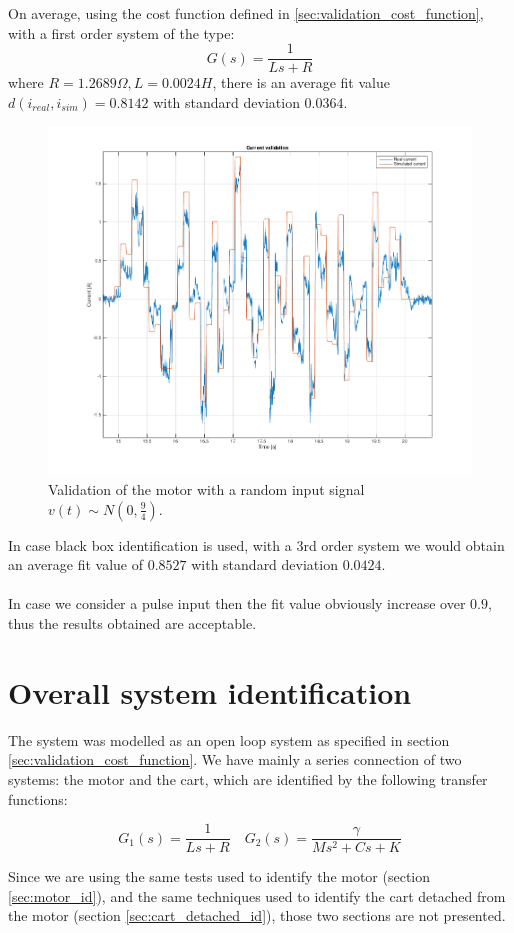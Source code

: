 On average, using the cost function defined in \ref{sec:validation_cost_function}, with a first order system of the type:
$$G(s) = \frac{1}{Ls+R}$$
where $R=1.2689 \Omega, L=0.0024 H$, there is an average fit value $d(i_{real},i_{sim})=0.8142$ with standard deviation $0.0364$.
\begin{figure}[!h]
    \centering
    \includegraphics[width=1\textwidth]{img/motor_validation.png}
    \caption{Validation of the motor with a random input signal $v(t) \sim N(0,\frac{9}{4})$.}
    \label{fig:motor_validation}
\end{figure}
In case black box identification is used, with a $3$rd order system we would obtain an average fit value of $0.8527$ with standard deviation $0.0424$. \\ \\
In case we consider a pulse input then the fit value obviously increase over $0.9$, thus the results obtained are acceptable.
\newpage
\section{Overall system identification}
The system was modelled as an open loop system as specified in section \ref{sec:validation_cost_function}.
We have mainly  a series connection of two systems: the motor and the cart, which are identified by the following transfer functions:

$$G_1(s) = \frac{1}{Ls+R} \quad G_2(s) = \frac{\gamma}{Ms^2+Cs+K}$$

Since we are using the same tests used to identify the motor (section \ref{sec:motor_id}), and the same techniques used to identify the cart detached from the motor (section \ref{sec:cart_detached_id}), those two sections are not presented.
